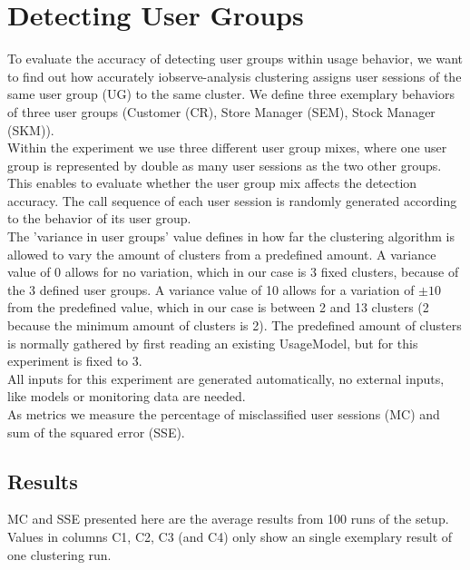 \documentclass[10pt,a4paper]{article}
\begin{document}
	\section{Detecting User Groups}
	To evaluate the accuracy of detecting user groups within usage behavior, we want to find out how accurately iobserve-analysis clustering assigns user sessions of the same user group (UG) to the same cluster. We define three exemplary behaviors of three user groups (Customer (CR), Store Manager (SEM), Stock Manager (SKM)).\\
	Within the experiment we use three different user group mixes, where one user group is represented by double as many user sessions as the two other groups. This enables to evaluate whether the user group mix affects the detection accuracy. The call sequence of each user session is randomly generated according to the behavior of its user group.\\
	The 'variance in user groups' value defines in how far the clustering algorithm is allowed to vary the amount of clusters from a predefined amount. A variance value of 0 allows for no variation, which in our case is 3 fixed clusters, because of the 3 defined user groups. A variance value of 10 allows for a variation of $\pm 10 $ from the predefined value, which in our case is between 2 and 13 clusters (2 because the minimum amount of clusters is 2). The predefined amount of clusters is normally gathered by first reading an existing UsageModel, but for this experiment is fixed to 3.\\
	All inputs for this experiment are generated automatically, no external inputs, like models or monitoring data are needed.\\
	As metrics we measure the percentage of misclassified user sessions (MC) and sum of the squared error (SSE). 
	\subsection{Results}
	MC and SSE presented here are the average results from 100 runs of the setup. Values in columns C1, C2, C3 (and C4) only show an single exemplary result of one clustering run.
\end{document}
